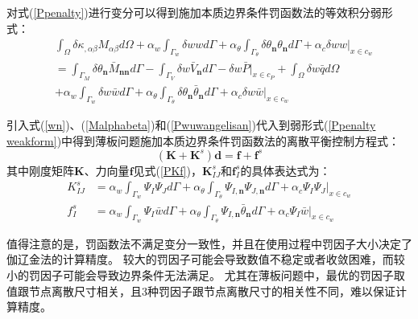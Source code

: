 对式(\ref{Ppenalty})进行变分可以得到施加本质边界条件罚函数法的等效积分弱形式：
\begin{equation}\label{Ppenalty weakform}
\begin{split}
    &\int_{\Omega}\delta\kappa_{,\alpha\beta}M_{\alpha\beta}d\Omega
    +\alpha_w\int_{\Gamma_w}\delta wwd\Gamma+\alpha_{\theta}\int_{\Gamma_{\theta}}\delta\theta_{\pmb{n}}\theta_{\pmb{n}}d\Gamma+\alpha_c\delta ww\vert_{x\in c_w}\\
    &=\int_{\Gamma_M}\delta\theta_{\pmb{n}}\bar{M}_{\pmb{nn}}d\Gamma-\int_{\Gamma_V}\delta w\bar{V}_{\pmb{n}}d\Gamma-\delta w\bar{P}\vert_{x\in c_P}+\int_{\Omega}\delta w\bar{q}d\Omega\\
    &+\alpha_w\int_{\Gamma_w}\delta w\bar{w}d\Gamma+\alpha_{\theta}\int_{\Gamma_{\theta}}\delta\theta_{\pmb{n}}\bar{\theta}_{\pmb{n}}d\Gamma+\alpha_c\delta w\bar{w}\vert_{x\in c_w}
\end{split}
\end{equation}\par
引入式(\ref{wn})、(\ref{Malphabeta})和(\ref{Pwuwangelisan})代入到弱形式(\ref{Ppenalty weakform})中得到薄板问题施加本质边界条件罚函数法的离散平衡控制方程式：
\begin{equation}
    (\pmb{K}+\pmb{K}^s)\pmb{d}=\pmb{f}+\pmb{f}^s
\end{equation}
其中刚度矩阵$\pmb{K}$、力向量$\pmb{f}$见式(\ref{PKf})，$\pmb K^s_{I\!J}$和$\pmb f^s_I$的具体表达式为：
\begin{align}
   K^s_{I\!J}&=\alpha_w\int_{\Gamma_w}\Psi_I\Psi_Jd\Gamma+\alpha_{\theta}\int_{\Gamma_{\theta}}\Psi_{I,\pmb n}\Psi_{J,\pmb n}d\Gamma+\alpha_c\Psi_I\Psi_J\vert_{x\in c_w}\\
f^s_I&=\alpha_w\int_{\Gamma_w}\Psi_I\bar{w}d\Gamma+\alpha_{\theta}\int_{\Gamma_{\theta}}\Psi_{I,\pmb n}\bar{\theta}_{\pmb n}d\Gamma+\alpha_c\Psi_I\bar{w}\vert_{x\in c_w}
\end{align}\par
值得注意的是，罚函数法不满足变分一致性，并且在使用过程中罚因子大小决定了伽辽金法的计算精度。
较大的罚因子可能会导致数值不稳定或者收敛困难，而较小的罚因子可能会导致边界条件无法满足。
尤其在薄板问题中，最优的罚因子取值跟节点离散尺寸相关，且3种罚因子跟节点离散尺寸的相关性不同，难以保证计算精度。
